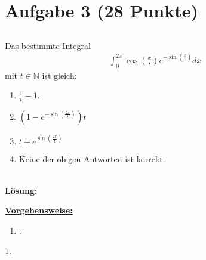 \section*{Aufgabe 3 (28 Punkte)}
\vspace{0.4cm}
\subsection*{}
Das bestimmte Integral
\begin{align*}
	\int_0^{2\pi} \cos \left(\frac{x}{t}\right) e^{- \sin(\frac{x}{t})} dx
\end{align*}
mit $ t \in \mathbb{N} $ ist gleich:

\renewcommand{\labelenumi}{(\alph{enumi})}
\begin{enumerate}
	\item 
	$ \frac{1}{t} -1  $.
	\item
	$ (1 - e^{-\sin\left(\frac{2\pi}{t}\right)})t $
	\item
	$ t + e^{\sin\left(\frac{2\pi}{t}\right)} $
	\item 
	Keine der obigen Antworten ist korrekt.
\end{enumerate}
\ \\
\textbf{Lösung:}
\begin{mdframed}
\underline{\textbf{Vorgehensweise:}}
\renewcommand{\labelenumi}{\theenumi.}
\begin{enumerate}
\item .
\end{enumerate}
\end{mdframed}

\underline{1.}\\


 
\newpage

